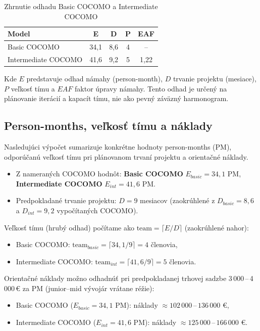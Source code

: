 \begin{table}[htbp]
\centering
\caption{Zhrnutie odhadu Basic COCOMO a Intermediate COCOMO}
\label{tab:cocomo-summary}
\small
\begin{tabular}{p{4.3cm} c c c c}
\toprule
Model & E & D & P & EAF \\
\midrule
Basic COCOMO & 34,1 & 8,6 & 4 & -- \\
Intermediate COCOMO & 41,6 & 9,2 & 5 & 1,22 \\
\bottomrule
\end{tabular}
\end{table}

Kde $E$ predstavuje odhad námahy (person-month), $D$ trvanie projektu (mesiace), $P$ veľkosť tímu a $EAF$ faktor úpravy námahy. Tento odhad je určený na plánovanie iterácií a kapacít tímu, nie ako pevný záväzný harmonogram.

\subsection{Person-months, veľkosť tímu a náklady}

Nasledujúci výpočet sumarizuje konkrétne hodnoty person-months (PM), odporúčanú veľkosť tímu pri plánovanom trvaní projektu a orientačné náklady.

\begin{itemize}
\item Z nameraných COCOMO hodnôt: \textbf{Basic COCOMO} $E_{basic}=34{,}1$ PM, \textbf{Intermediate COCOMO} $E_{int}=41{,}6$ PM.
\item Predpokladané trvanie projektu: $D=9$ mesiacov (zaokrúhlené z $D_{basic}=8{,}6$ a $D_{int}=9{,}2$ vypočítaných COCOMO).
\end{itemize}

Veľkosť tímu (hrubý odhad) počítame ako $\mathrm{team}=\lceil E / D \rceil$ (zaokrúhlené nahor):

\begin{itemize}
\item Basic COCOMO: $\mathrm{team}_{basic}=\lceil 34{,}1 / 9 \rceil = 4$ členovia,
\item Intermediate COCOMO: $\mathrm{team}_{int}=\lceil 41{,}6 / 9 \rceil = 5$ členovia.
\end{itemize}

Orientačné náklady možno odhadnúť pri predpokladanej trhovej sadzbe 3\,000\,–\,4\,000\,€ za PM (junior--mid vývojár vrátane réžie):

\begin{itemize}
\item Basic COCOMO ($E_{basic}=34{,}1$ PM): náklady $\approx 102\,000\,–\,136\,000$ €,
\item Intermediate COCOMO ($E_{int}=41{,}6$ PM): náklady $\approx 125\,000\,–\,166\,000$ €.
\end{itemize}

